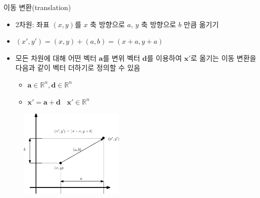 \documentclass{beamer}
\begin{document}
\begin{frame}{이동 변환(translation)}

{\small
\begin{itemize}
\item 2차원: 좌표 $(x,y)$를 $x$ 축 방향으로 $a$, $y$ 축 방향으로 $b$ 만큼 옮기기
\item $(x', y') = (x,y) + (a,b) = (x+a, y+a)$
\end{itemize}

\begin{itemize}
\item 모든 차원에 대해
어떤 벡터 $\mathbf a$를 변위 벡터 $\mathbf d$를 이용하여 $\mathbf x'$로 옮기는 이동 변환을 다음과 같이 벡터 더하기로 정의할 수 있음
	\begin{itemize}
	\item $\mathbf a \in \mathbb R^n, \mathbf d \in \mathbb R^n$
	\item $\mathbf x' = \mathbf a + \mathbf d~~~~\mathbf x' \in \mathbb R^n$
	\end{itemize}
\end{itemize}


\begin{figure}
    \includegraphics[width=5cm]{Math_transform/translation.eps}
\end{figure}
}

\end{frame}
\end{document}
